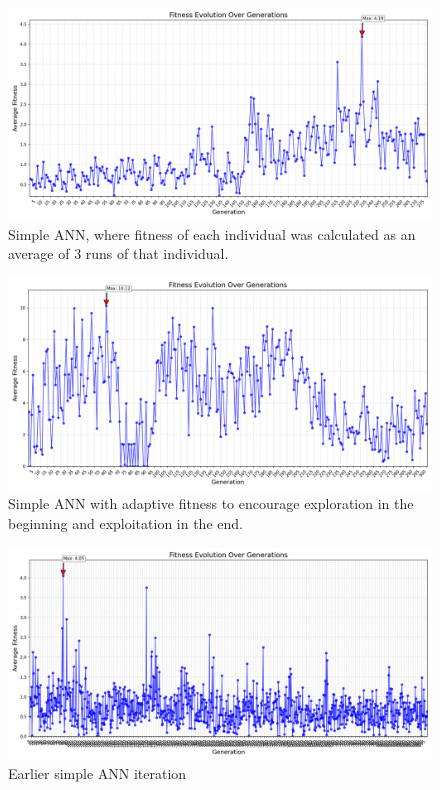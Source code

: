 \documentclass[final,5p,times,twocolumn,authoryear]{elsarticle}
\begin{document}
\begin{figure}[H]
    \centering
    \includegraphics[width=1\linewidth]{figures/ann_simples_3runs_params2.png}
    \caption{Simple ANN, where fitness of each individual was calculated as an average of 3 runs of that individual.}
    \label{fig:ann_simples_3runs_params2}
\end{figure}

\begin{figure}[H]
    \centering
    \includegraphics[width=1\linewidth]{figures/ann_simples_leonor_params2.png}
    \caption{Simple ANN with adaptive fitness to encourage exploration in the beginning and exploitation in the end.}
    \label{fig:enter-label}
\end{figure}

\begin{figure}[H]
    \centering
    \includegraphics[width=1\linewidth]{figures/aold_ann_simples_params2.png}
    \caption{Earlier simple ANN iteration}
    \label{fig:enter-label}
\end{figure}
\end{document}
